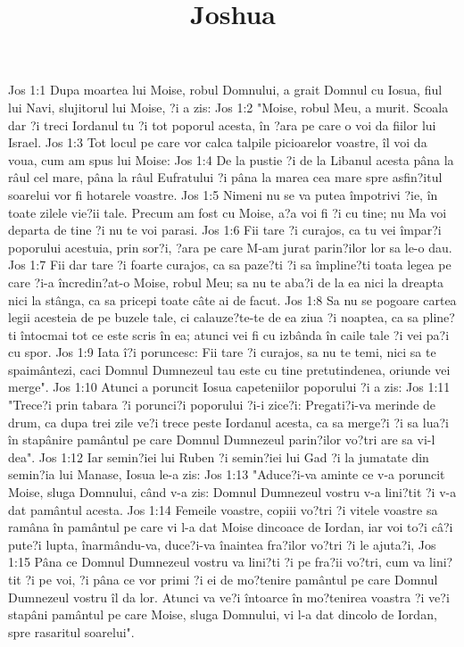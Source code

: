 

\title{Joshua}

Jos 1:1  Dupa moartea lui Moise, robul Domnului, a grait Domnul cu Iosua, fiul lui Navi, slujitorul lui Moise, ?i a zis:
Jos 1:2  "Moise, robul Meu, a murit. Scoala dar ?i treci Iordanul tu ?i tot poporul acesta, în ?ara pe care o voi da fiilor lui Israel.
Jos 1:3  Tot locul pe care vor calca talpile picioarelor voastre, îl voi da voua, cum am spus lui Moise:
Jos 1:4  De la pustie ?i de la Libanul acesta pâna la râul cel mare, pâna la râul Eufratului ?i pâna la marea cea mare spre asfin?itul soarelui vor fi hotarele voastre.
Jos 1:5  Nimeni nu se va putea împotrivi ?ie, în toate zilele vie?ii tale. Precum am fost cu Moise, a?a voi fi ?i cu tine; nu Ma voi departa de tine ?i nu te voi parasi.
Jos 1:6  Fii tare ?i curajos, ca tu vei împar?i poporului acestuia, prin sor?i, ?ara pe care M-am jurat parin?ilor lor sa le-o dau.
Jos 1:7  Fii dar tare ?i foarte curajos, ca sa paze?ti ?i sa împline?ti toata legea pe care ?i-a încredin?at-o Moise, robul Meu; sa nu te aba?i de la ea nici la dreapta nici la stânga, ca sa pricepi toate câte ai de facut.
Jos 1:8  Sa nu se pogoare cartea legii acesteia de pe buzele tale, ci calauze?te-te de ea ziua ?i noaptea, ca sa pline?ti întocmai tot ce este scris în ea; atunci vei fi cu izbânda în caile tale ?i vei pa?i cu spor.
Jos 1:9  Iata î?i poruncesc: Fii tare ?i curajos, sa nu te temi, nici sa te spaimântezi, caci Domnul Dumnezeul tau este cu tine pretutindenea, oriunde vei merge".
Jos 1:10  Atunci a poruncit Iosua capeteniilor poporului ?i a zis:
Jos 1:11  "Trece?i prin tabara ?i porunci?i poporului ?i-i zice?i: Pregati?i-va merinde de drum, ca dupa trei zile ve?i trece peste Iordanul acesta, ca sa merge?i ?i sa lua?i în stapânire pamântul pe care Domnul Dumnezeul parin?ilor vo?tri are sa vi-l dea".
Jos 1:12  Iar semin?iei lui Ruben ?i semin?iei lui Gad ?i la jumatate din semin?ia lui Manase, Iosua le-a zis:
Jos 1:13  "Aduce?i-va aminte ce v-a poruncit Moise, sluga Domnului, când v-a zis: Domnul Dumnezeul vostru v-a lini?tit ?i v-a dat pamântul acesta.
Jos 1:14  Femeile voastre, copiii vo?tri ?i vitele voastre sa ramâna în pamântul pe care vi l-a dat Moise dincoace de Iordan, iar voi to?i câ?i pute?i lupta, înarmându-va, duce?i-va înaintea fra?ilor vo?tri ?i le ajuta?i,
Jos 1:15  Pâna ce Domnul Dumnezeul vostru va lini?ti ?i pe fra?ii vo?tri, cum va lini?tit ?i pe voi, ?i pâna ce vor primi ?i ei de mo?tenire pamântul pe care Domnul Dumnezeul vostru îl da lor. Atunci va ve?i întoarce în mo?tenirea voastra ?i ve?i stapâni pamântul pe care Moise, sluga Domnului, vi l-a dat dincolo de Iordan, spre rasaritul soarelui".
